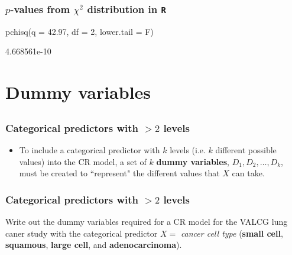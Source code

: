 \begin{frame}[fragile]
\frametitle{$p$-values from $\chi^2$ distribution in \texttt{R}}
\begin{Rcode}{.25}
pchisq(q = 42.97, df = 2, lower.tail = F)
\end{Rcode}
\begin{Rout}{.25}
4.668561e-10
\end{Rout}
\vskip200pt
\end{frame}

\section[Dummy variables]{Dummy variables}
\subsection{}
\begin{frame}
\end{frame}


\begin{frame}
\frametitle{Categorical predictors with $>2$ levels}
\begin{itemize}
\item To include a categorical predictor with $k$ levels (i.e. $k$ different possible values) into the CR model, a set of $k$ \textbf{dummy variables}, $D_1,D_2,\ldots,D_k$, must be created to ``represent" the different values that $X$ can take.
\end{itemize}
\vskip200pt
\end{frame}

\begin{frame}
\frametitle{Categorical predictors with $>2$ levels}
Write out the dummy variables required for a CR model for the VALCG lung caner study with the categorical predictor $X=$ \textit{cancer cell type} (\textbf{small cell}, \textbf{squamous}, \textbf{large cell}, and \textbf{adenocarcinoma}).
\vskip200pt
\end{frame}

